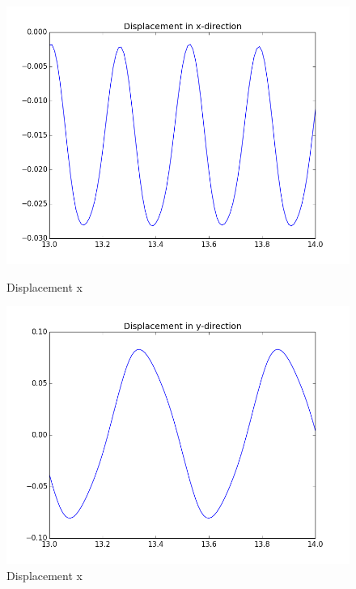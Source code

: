 \begin{figure}[H] 
  \label{FSI2_plots} 
  \begin{minipage}[b]{0.6\linewidth}
    \centering
    \includegraphics[width=0.9\linewidth]{./Verification_Validation/Hron_Turek/FSI2_dis_x.png} 
    \caption{Displacement x} 
    \vspace{4ex}
  \end{minipage}%
  \begin{minipage}[b]{0.6\linewidth}
    \centering
    \includegraphics[width=0.9\linewidth]{./Verification_Validation/Hron_Turek/FSI2_dis_y.png} 
    \caption{Displacement x} 
    \vspace{4ex}
  \end{minipage} 
  \begin{minipage}[b]{0.6\linewidth}
    \centering

\end{minipage}
\end{figure}
